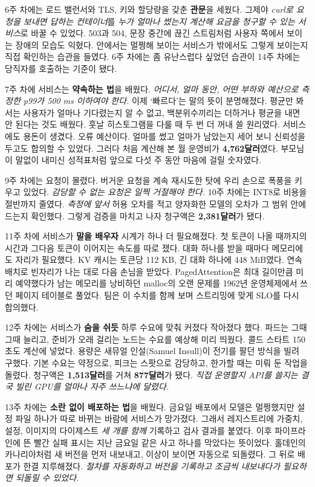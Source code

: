 6주 차에는 로드 밸런서와 TLS, 키와 할당량을 갖춘 \textbf{관문}을 세웠다. 그제야 \textit{curl로 요청을 보내면 답하는 컨테이너}를 \textit{누가 얼마나 썼는지 계산해 요금을 청구할 수 있는 서비스}로 바꿀 수 있었다. 503과 504, 문장 중간에 끊긴 스트림처럼 사용자 쪽에서 보이는 장애의 모습도 익혔다. 안에서는 멀쩡해 보이는 서비스가 밖에서도 그렇게 보이는지 직접 확인하는 습관을 들였다. 6주 차에는 좀 유난스럽다 싶었던 습관이 14주 차에는 당직자를 호출하는 기준이 됐다.

7주 차에 서비스는 \textbf{약속하는 법}을 배웠다. \textit{어디서, 얼마 동안, 어떤 부하와 예산으로 측정한 p99가 500 ms 이하여야 한다.} 이제 ‘빠르다’는 말의 뜻이 분명해졌다. 평균만 봐서는 사용자가 얼마나 기다렸는지 알 수 없고, 백분위수끼리는 더하거나 평균을 내면 안 된다는 것도 배웠다. 훗날 히스토그램을 다룰 때 두 번 더 꺼내 쓸 원리였다. 서비스에도 용돈이 생겼다. 오류 예산이다. 얼마를 썼고 얼마가 남았는지 세어 보니 신뢰성을 두고도 합의할 수 있었다. 그러다 처음 계산해 본 월 운영비가 \textbf{4,762달러}였다. 부모님이 말없이 내미신 성적표처럼 앞으로 다섯 주 동안 마음에 걸릴 숫자였다.

9주 차에는 요청이 몰렸다. 버거운 요청을 계속 재시도한 탓에 우리 손으로 폭풍을 키우고 있었다. \textit{감당할 수 없는 요청은 일찍 거절해야 한다.} 10주 차에는 INT8로 비용을 절반까지 줄였다. \textit{측정에 앞서} 허용 오차를 적고 양자화한 모델의 오차가 그 범위 안에 드는지 확인했다. 그렇게 검증을 마치고 나자 청구액은 \textbf{2,381달러}가 됐다.

11주 차에 서비스가 \textbf{말을 배우자} 시계가 하나 더 필요해졌다. 첫 토큰이 나올 때까지의 시간과 그다음 토큰이 이어지는 속도를 따로 쟀다. 대화 하나를 받을 때마다 메모리에도 자리가 필요했다. KV 캐시는 토큰당 112 KB, 긴 대화 하나에 448 MiB였다. 연속 배치로 빈자리가 나는 대로 다음 손님을 받았다. PagedAttention은 최대 길이만큼 미리 예약했다가 남는 메모리를 낭비하던 malloc의 오랜 문제를 1962년 운영체제에서 쓰던 페이지 테이블로 풀었다. 팀은 이 수치를 함께 보며 스트리밍에 맞게 SLO를 다시 합의했다.

12주 차에는 서비스가 \textbf{숨을 쉬듯} 하루 수요에 맞춰 커졌다 작아졌다 했다. 파드는 그때그때 늘리고, 준비가 오래 걸리는 노드는 수요를 예상해 미리 띄웠다. 콜드 스타트 150초도 계산에 넣었다. 용량은 새뮤얼 인설(Samuel Insull)이 전기를 팔던 방식을 빌려 구했다. 기본 수요는 약정으로, 피크는 스팟으로 감당하고, 한가할 때는 미뤄 둔 작업을 돌렸다. 청구액은 \textbf{1,513달러}를 거쳐 \textbf{877달러}가 됐다. \textit{직접 운영할지 API를 쓸지는 결국 빌린 GPU를 얼마나 자주 쓰느냐에 달렸다.}

13주 차에는 \textbf{소란 없이 배포하는 법}을 배웠다. 금요일 배포에서 모델은 멀쩡했지만 설정 파일 하나가 따로 바뀌는 바람에 서비스가 망가졌다. 그래서 레지스트리에 가중치, 설정, 이미지의 다이제스트 \textit{세 개를 함께} 기록하고 검사 결과를 붙였다. 이후 파이프라인에 뜬 빨간 실패 표시는 지난 금요일 같은 사고 하나를 막았다는 뜻이었다. 홀데인의 카나리아처럼 새 버전을 먼저 내보내고, 이상이 보이면 자동으로 되돌렸다. 그 뒤로 배포가 한결 지루해졌다. \textit{절차를 자동화하고 버전을 기록하고 조금씩 내보내다가 필요하면 되돌릴 수 있었다.}

